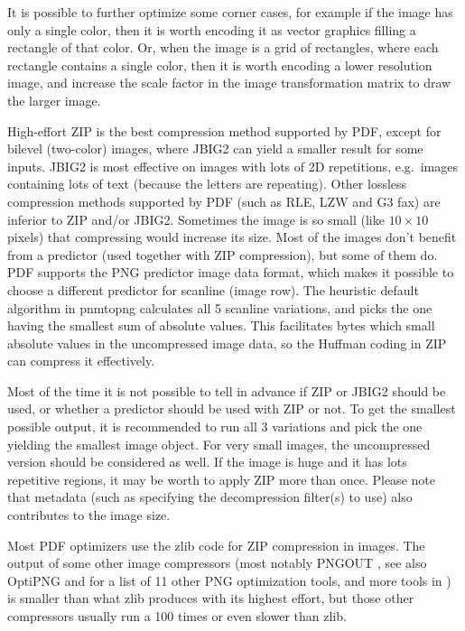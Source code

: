 \documentclass{ltugproc}
\def\cmd{\textsf}
\def\pkg{\textsf}
\begin{document}
It is possible to further optimize some corner cases, for example if the
image has only a single color, then it is worth encoding it as vector
graphics filling a rectangle of that color. Or, when the image is a grid of
rectangles, where each rectangle contains a single color, then it is worth
encoding a lower resolution image, and increase the scale factor in the
image transformation matrix to draw the larger image.

High-effort ZIP is the best compression method supported by PDF, except
for bilevel (two-color) images, where JBIG2 can yield a smaller result for
some inputs. JBIG2 is most effective on images with lots of 2D repetitions,
e.g.\ images containing lots of text (because the letters are repeating).
Other lossless compression methods supported by PDF (such as RLE, LZW and G3
fax) are inferior to ZIP and/or JBIG2. Sometimes the image is so small (like
$10\times10$ pixels) that compressing would increase its size.
Most of the images don't benefit from a predictor (used
together with ZIP compression), but some of them do. PDF supports the PNG
predictor image data format, which makes it possible to choose a different
predictor for scanline (image row). The heuristic default algorithm in
\cmd{pnmtopng} calculates all 5 scanline variations, and picks the one
having the smallest sum of absolute values. This facilitates bytes which
small absolute values in the uncompressed image data, so the Huffman coding
in ZIP can compress it effectively.

Most of the time it is not possible to tell in advance if ZIP or JBIG2
should be used, or whether a predictor should be used with ZIP or not. To
get the smallest possible output, it is recommended to run all 3 variations
and pick the one yielding the smallest image object. For very small images,
the uncompressed version should be considered as well. If the image is huge
and it has lots repetitive regions, it may be worth to apply ZIP more than
once. Please note that metadata (such as specifying the decompression
filter(s) to use) also contributes to the image size.

Most PDF optimizers use the \pkg{zlib} code for ZIP compression in images.
The output of some other image compressors (most notably PNGOUT
\cite{pngout}, see also OptiPNG \cite{optipng} and \cite{optipng-article}
for a list of 11 other PNG optimization tools, and more tools in
\cite{png-recompressors})
is smaller than what \pkg{zlib} produces with its highest effort, but those
other compressors usually run a 100 times or even slower than \pkg{zlib}.
\end{document}
